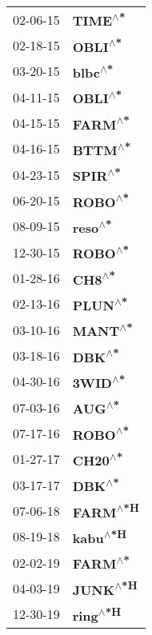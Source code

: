 \begin{supertabular}{p{0.08\textwidth}p{0.2\textwidth}}
 02-06-15 &   \textbf{TIME\textsuperscript{$\wedge$*}} \\
 02-18-15 &   \textbf{OBLI\textsuperscript{$\wedge$*}} \\
 03-20-15 &   \textbf{blbc\textsuperscript{$\wedge$*}} \\
 04-11-15 &   \textbf{OBLI\textsuperscript{$\wedge$*}} \\
 04-15-15 &   \textbf{FARM\textsuperscript{$\wedge$*}} \\
 04-16-15 &   \textbf{BTTM\textsuperscript{$\wedge$*}} \\
 04-23-15 &   \textbf{SPIR\textsuperscript{$\wedge$*}} \\
 06-20-15 &   \textbf{ROBO\textsuperscript{$\wedge$*}} \\
 08-09-15 &   \textbf{reso\textsuperscript{$\wedge$*}} \\
 12-30-15 &   \textbf{ROBO\textsuperscript{$\wedge$*}} \\
 01-28-16 &    \textbf{CH8\textsuperscript{$\wedge$*}} \\
 02-13-16 &   \textbf{PLUN\textsuperscript{$\wedge$*}} \\
 03-10-16 &   \textbf{MANT\textsuperscript{$\wedge$*}} \\
 03-18-16 &    \textbf{DBK\textsuperscript{$\wedge$*}} \\
 04-30-16 &   \textbf{3WID\textsuperscript{$\wedge$*}} \\
 07-03-16 &    \textbf{AUG\textsuperscript{$\wedge$*}} \\
 07-17-16 &   \textbf{ROBO\textsuperscript{$\wedge$*}} \\
 01-27-17 &   \textbf{CH20\textsuperscript{$\wedge$*}} \\
 03-17-17 &    \textbf{DBK\textsuperscript{$\wedge$*}} \\
 07-06-18 &  \textbf{FARM\textsuperscript{$\wedge$*H}} \\
 08-19-18 &  \textbf{kabu\textsuperscript{$\wedge$*H}} \\
 02-02-19 &   \textbf{FARM\textsuperscript{$\wedge$*}} \\
 04-03-19 &  \textbf{JUNK\textsuperscript{$\wedge$*H}} \\
 12-30-19 &  \textbf{ring\textsuperscript{$\wedge$*H}} \\
\end{supertabular}
